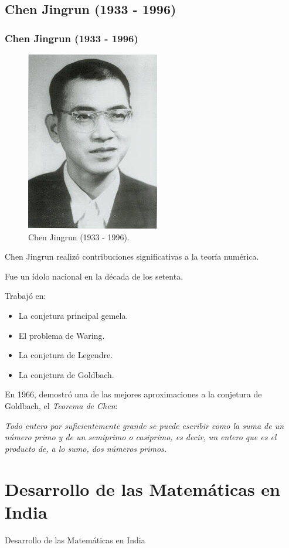 \documentclass[compress, aspectratio=169]{beamer} %
\begin{document}
	\subsection{Chen Jingrun (1933 - 1996)}
		\begin{frame}
			\frametitle{Chen Jingrun (1933 - 1996)}
			\begin{figure}
				\centering
				\includegraphics[width = .25\linewidth]{chen_jingrun.jpg}
				\caption{Chen Jingrun (1933 - 1996).}
			\end{figure}
			
		\end{frame}
		\begin{frame}
			Chen Jingrun realizó contribuciones significativas a la teoría numérica.
			
			Fue un ídolo nacional en la década de los setenta.
			
			Trabajó en:
			\begin{itemize}
				\item La conjetura principal gemela.
				\item El problema de Waring.
				\item La conjetura de Legendre.
				\item La conjetura de Goldbach.
			\end{itemize}
		\end{frame}
		
		\begin{frame}
			En 1966, demostró una de las mejores aproximaciones a la conjetura de Goldbach, el \textit{Teorema de Chen}:
			
			\begin{center}
				\em
				Todo entero par suficientemente grande se puede escribir como la suma de un número primo y de un semiprimo
				o casiprimo, es decir, un entero que es el producto de, a lo sumo, dos números primos.
			\end{center}						
		\end{frame}

\section{Desarrollo de las Matemáticas en India}
	\begin{frame}
		\Huge{\centerline{Desarrollo de las Matemáticas en India}}
	\end{frame}
\end{document}
